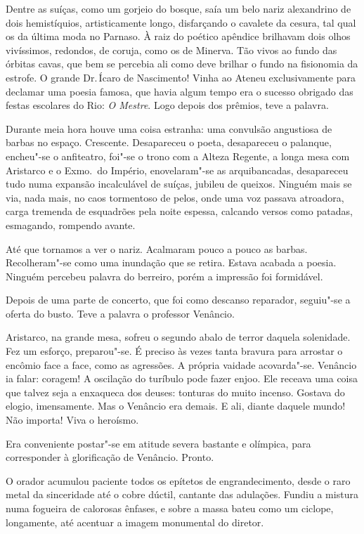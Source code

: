 Dentre as suíças, como um gorjeio do bosque, saía um belo nariz
alexandrino de dois hemistíquios, artisticamente longo, disfarçando o
cavalete da cesura, tal qual os da última moda no Parnaso. À raiz do
poético apêndice brilhavam dois olhos vivíssimos, redondos, de coruja,
como os de Minerva. Tão vivos ao fundo das órbitas cavas, que bem se
percebia ali como deve brilhar o fundo na fisionomia da estrofe. O
grande Dr.\,Ícaro de Nascimento! Vinha ao Ateneu exclusivamente para
declamar uma poesia famosa, que havia algum tempo era o sucesso
obrigado das festas escolares do Rio: \textit{O Mestre}. Logo depois dos
prêmios, teve a palavra.

Durante meia hora houve uma coisa estranha: uma convulsão angustiosa de
barbas no espaço. Crescente. Desapareceu o poeta, desapareceu o
palanque, encheu"-se o anfiteatro, foi"-se o trono com a Alteza
Regente, a longa mesa com Aristarco e o Exmo.~do Império,
enovelaram"-se as arquibancadas, desapareceu tudo numa expansão
incalculável de suíças, jubileu de queixos. Ninguém mais se via, nada
mais, no caos tormentoso de pelos, onde uma voz passava atroadora,
carga tremenda de esquadrões pela noite espessa, calcando versos como
patadas, esmagando, rompendo avante. 


Até que tornamos a ver o nariz.
Acalmaram pouco a pouco as barbas. Recolheram"-se como uma inundação
que se retira. Estava acabada a poesia. Ninguém percebeu palavra do
berreiro, porém a impressão foi formidável. 

Depois de uma parte de
concerto, que foi como descanso reparador, seguiu"-se a oferta do
busto. Teve a palavra o professor Venâncio. 

Aristarco, na grande mesa,
sofreu o segundo abalo de terror daquela solenidade. Fez um esforço,
preparou"-se. É preciso às vezes tanta bravura para arrostar o encômio
face a face, como as agressões. A própria vaidade acovarda"-se.
Venâncio ia falar: coragem! A oscilação do turíbulo pode fazer enjoo.
Ele receava uma coisa que talvez seja a enxaqueca dos deuses: tonturas
do muito incenso. Gostava do elogio, imensamente. Mas o Venâncio era
demais. E ali, diante daquele mundo! Não importa! Viva o heroísmo. 

Era conveniente postar"-se em atitude severa bastante e olímpica, para
corresponder à glorificação de Venâncio. Pronto. 

O orador acumulou
paciente todos os epítetos de engrandecimento, desde o raro metal da
sinceridade até o cobre dúctil, cantante das adulações. Fundiu a
mistura numa fogueira de calorosas ênfases, e sobre a massa bateu como
um ciclope, longamente, até acentuar a imagem monumental do diretor.

